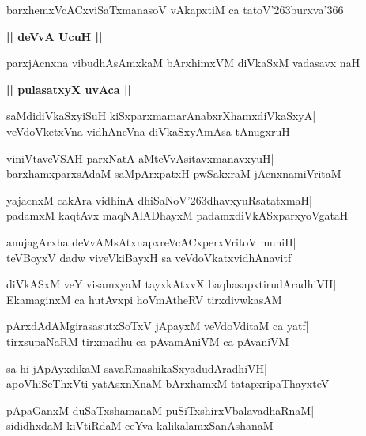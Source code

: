 \documentclass[twoside,12pt,openright]{book}
\def\S{\char'263}
\newcounter{shloka}[chapter]
\def\uvaca#1{\centerline{{\large\textbf{#1}}}}
\begin{document}
\begin{shloka}%
barxhemxVcACxviSaTxmanasoV vAkapxtiM ca tatoV\S burxva\char'366
\end{shloka}

\uvaca{|| deVvA UcuH ||}
\begin{shloka}%
parxjAcnxna vibudhAsAmxkaM bArxhimxVM diVkaSxM vadasavx naH
\end{shloka}

\uvaca{|| pulasatxyX uvAca ||}
\begin{shloka}%
saMdidiVkaSxyiSuH kiSxparxmamarAnabxrXhamxdiVkaSxyA|\\
veVdoVketxVna vidhAneVna diVkaSxyAmAsa tAnugxruH
\end{shloka}

\begin{shloka}%
viniVtaveVSAH parxNatA aMteVvAsitavxmanavxyuH|\\
barxhamxparxsAdaM saMpArxpatxH pwSakxraM jAcnxnamiVritaM
\end{shloka}

\begin{shloka}%
yajacnxM cakAra vidhinA dhiSaNoV\S dhavxyuRsatatxmaH|\\
padamxM kaqtAvx maqNAlADhayxM padamxdiVkASxparxyoVgataH
\end{shloka}

\begin{shloka}%
anujagArxha deVvAMsAtxnapxreVcACxperxVritoV muniH|\\
teVBoyxV dadw viveVkiBayxH sa veVdoVkatxvidhAnavitf 
\end{shloka}

\begin{shloka}%
diVkASxM veY visamxyaM tayxkAtxvX baqhasapxtirudAradhiVH|\\
EkamaginxM ca hutAvxpi hoVmAtheRV tirxdivwkasAM
\end{shloka}

\begin{shloka}%
pArxdAdAMgirasasutxSoTxV jApayxM veVdoVditaM ca yatf|\\
tirxsupaNaRM tirxmadhu ca pAvamAniVM ca pAvaniVM
\end{shloka}

\begin{shloka}%
sa hi jApAyxdikaM savaRmashikaSxyadudAradhiVH|\\
apoVhiSeThxVti yatAsxnXnaM bArxhamxM tatapxripaThayxteV
\end{shloka}

\begin{shloka}%
pApaGanxM duSaTxshamanaM puSiTxshirxVbalavadhaRnaM|\\
sididhxdaM kiVtiRdaM ceYva kalikalamxSanAshanaM
\end{shloka}
\end{document}
